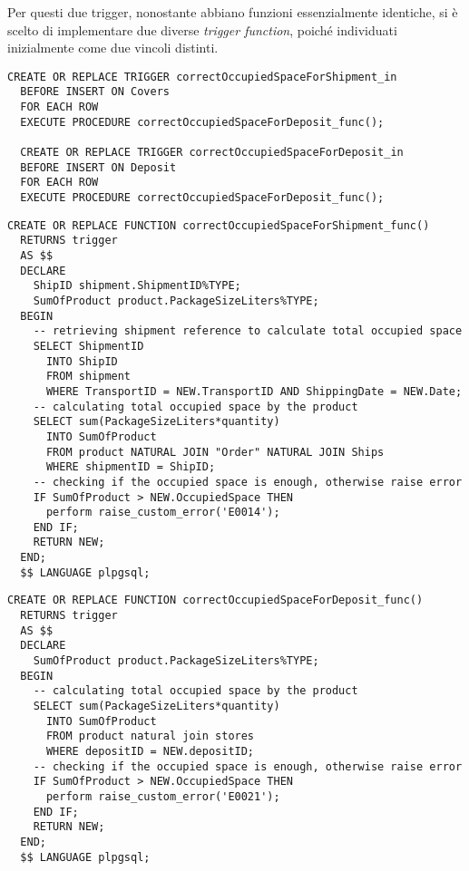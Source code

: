 Per questi due trigger, nonostante abbiano funzioni essenzialmente identiche, si è scelto di implementare due diverse \textit{trigger function}, poiché individuati inizialmente come due vincoli distinti.

\begin{lstlisting}[caption={Trigger per i vincoli \textbf{correctOccupiedSpaceForShipment} e \textbf{correctOccupiedSpaceForDeposit}}]
  CREATE OR REPLACE TRIGGER correctOccupiedSpaceForShipment_in
  BEFORE INSERT ON Covers
  FOR EACH ROW
  EXECUTE PROCEDURE correctOccupiedSpaceForDeposit_func();

  CREATE OR REPLACE TRIGGER correctOccupiedSpaceForDeposit_in
  BEFORE INSERT ON Deposit
  FOR EACH ROW
  EXECUTE PROCEDURE correctOccupiedSpaceForDeposit_func();
\end{lstlisting}

\begin{lstlisting}[caption={Funzione per il vincolo \textbf{correctOccupiedSpaceForShipment}}]
  CREATE OR REPLACE FUNCTION correctOccupiedSpaceForShipment_func() 
  RETURNS trigger
  AS $$
  DECLARE
    ShipID shipment.ShipmentID%TYPE;
    SumOfProduct product.PackageSizeLiters%TYPE;
  BEGIN
    -- retrieving shipment reference to calculate total occupied space
    SELECT ShipmentID
      INTO ShipID
      FROM shipment
      WHERE TransportID = NEW.TransportID AND ShippingDate = NEW.Date;
    -- calculating total occupied space by the product
    SELECT sum(PackageSizeLiters*quantity)
      INTO SumOfProduct
      FROM product NATURAL JOIN "Order" NATURAL JOIN Ships
      WHERE shipmentID = ShipID;
    -- checking if the occupied space is enough, otherwise raise error
    IF SumOfProduct > NEW.OccupiedSpace THEN
      perform raise_custom_error('E0014');
    END IF;
    RETURN NEW;
  END;
  $$ LANGUAGE plpgsql;
\end{lstlisting}

\begin{lstlisting}[caption={Funzione per il vincolo \textbf{correctOccupiedSpaceForDeposit}}]
  CREATE OR REPLACE FUNCTION correctOccupiedSpaceForDeposit_func()
  RETURNS trigger
  AS $$
  DECLARE
    SumOfProduct product.PackageSizeLiters%TYPE;
  BEGIN
    -- calculating total occupied space by the product
    SELECT sum(PackageSizeLiters*quantity)
      INTO SumOfProduct
      FROM product natural join stores
      WHERE depositID = NEW.depositID;
    -- checking if the occupied space is enough, otherwise raise error
    IF SumOfProduct > NEW.OccupiedSpace THEN
      perform raise_custom_error('E0021');
    END IF;
    RETURN NEW;
  END;
  $$ LANGUAGE plpgsql;
\end{lstlisting}

